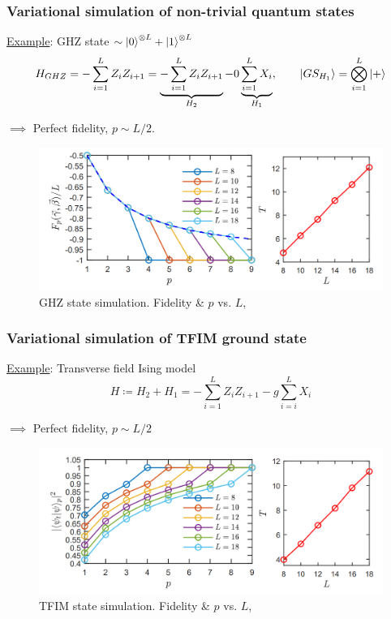 \documentclass{beamer}
\theoremstyle{definition}
\begin{document}
\begin{frame}
\frametitle{Variational simulation of non-trivial quantum states}

\underline{Example}: GHZ state $\sim \left\vert{0}\right\rangle^{\otimes L} + \left\vert{1}\right\rangle^{\otimes L} $ 
\begin{equation*}
H_{GHZ} = -\sum^L_{i=1}Z_i Z_{i+1} = \underbrace{-\sum^L_{i=1}Z_i Z_{i+1}}_{H_2} - 0\underbrace{\sum^L_{i=1}X_i}_{H_1}, \qquad \left\vert{GS_{H_1}}\right\rangle = \bigotimes^L_{i=1} \left\vert{+}\right\rangle
\end{equation*}

\pause

$\implies$ Perfect fidelity, $p \sim L/2$.

\begin{figure}[!htb]
	\centering
	\includegraphics[scale=0.25]{ghz1}
	\caption{GHZ state simulation. Fidelity \& $p$ vs. $L$, \cite{VQCS}}
\end{figure}

\end{frame}




\begin{frame}
\frametitle{Variational simulation of TFIM ground state}

\underline{Example}: Transverse field Ising model
\begin{equation*}
H \coloneqq H_2 + H_1 =  - \sum_{i=1}^L Z_i Z_{i+1} - g\sum^L_{i=i}X_i
\end{equation*}

\pause

$\implies$ Perfect fidelity, $p\sim L/2$
\begin{figure}[!htb]
	\centering
	\includegraphics[scale=0.25]{tfim}
	\caption{TFIM state simulation. Fidelity \& $p$ vs. $L$, \cite{VQCS}}
\end{figure}






\end{frame}
\end{document}
